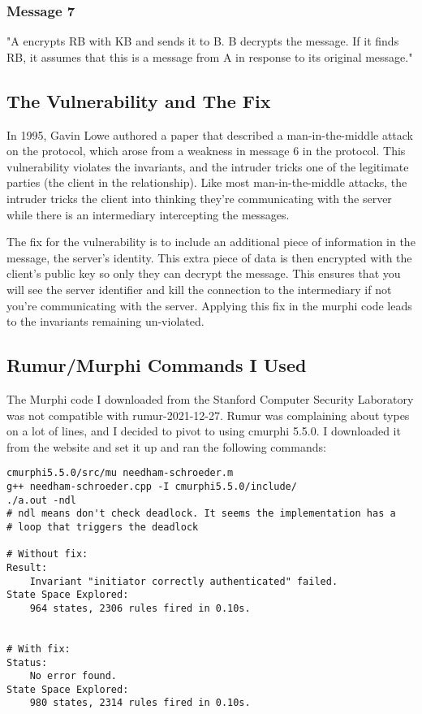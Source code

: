 \documentclass{article}
\begin{document}
\subsubsection{Message 7}

"A encrypts RB with KB and sends it to B. B decrypts the message. If it finds RB, it assumes that this is a message from A in response to its original message."\cite{ns_protocol}

\subsection{The Vulnerability and The Fix}

In 1995, Gavin Lowe authored a paper \cite{LOWE} that described a man-in-the-middle attack on the protocol, which arose from a weakness in message 6 in the protocol. This vulnerability violates the invariants, and the intruder tricks one of the legitimate parties (the client in the relationship). Like most man-in-the-middle attacks, the intruder tricks the client into thinking they're communicating with the server while there is an intermediary intercepting the messages.

The fix for the vulnerability is to include an additional piece of information in the message, the server's identity. This extra piece of data is then encrypted with the client's public key so only they can decrypt the message. This ensures that you will see the server identifier and kill the connection to the intermediary if not you're communicating with the server. Applying this fix in the murphi code leads to the invariants remaining un-violated.


\subsection{Rumur/Murphi Commands I Used}

The Murphi code I downloaded from the Stanford Computer Security Laboratory was not compatible with rumur-2021-12-27. Rumur was complaining about types on a lot of lines, and I decided to pivot to using cmurphi 5.5.0. I downloaded it from the website and set it up and ran the following commands:

\begin{verbatim}
cmurphi5.5.0/src/mu needham-schroeder.m 
g++ needham-schroeder.cpp -I cmurphi5.5.0/include/
./a.out -ndl
# ndl means don't check deadlock. It seems the implementation has a
# loop that triggers the deadlock 

# Without fix:
Result:
    Invariant "initiator correctly authenticated" failed.
State Space Explored:
    964 states, 2306 rules fired in 0.10s.


# With fix:
Status:
    No error found.
State Space Explored:
    980 states, 2314 rules fired in 0.10s.
\end{verbatim}
\end{document}
